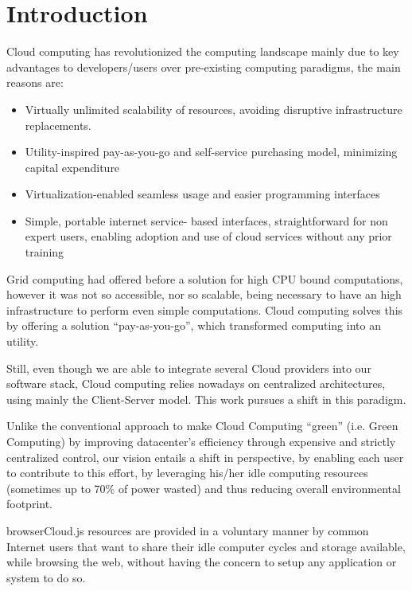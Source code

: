 
% 
% 

\section{Introduction}

Cloud computing has revolutionized the computing landscape mainly due to key advantages to developers/users over pre-existing computing paradigms, the main reasons are:
\begin{itemize}
  \item Virtually unlimited scalability of resources, avoiding disruptive infrastructure replacements.
  \item Utility-inspired pay-as-you-go and self-service purchasing model, minimizing capital expenditure
  \item Virtualization-enabled seamless usage and easier programming interfaces
  \item Simple, portable internet service- based interfaces, straightforward for non expert users, enabling adoption and use of cloud services without any prior training
 \end{itemize} 

Grid computing had offered before a solution for high CPU bound computations, however it was not so accessible, nor so scalable, being necessary to have an high infrastructure to perform even simple computations. Cloud computing solves this by offering a solution ``pay-as-you-go'', which transformed computing into an utility.

Still, even though we are able to integrate several Cloud providers into our software stack, Cloud computing relies nowadays on centralized architectures, using mainly the Client-Server model. This work pursues a shift in this paradigm.

Unlike the conventional approach to make Cloud Computing “green” (i.e. Green Computing) by improving datacenter's efficiency through expensive and strictly centralized control, our vision entails a shift in perspective, by enabling each user to contribute to this effort, by leveraging his/her idle computing resources (sometimes up to 70\% of power wasted) and thus reducing overall environmental footprint.

browserCloud.js resources are provided in a voluntary manner by common Internet users that want to share their idle computer cycles and storage available, while browsing the web, without having the concern to setup any application or system to do so.

